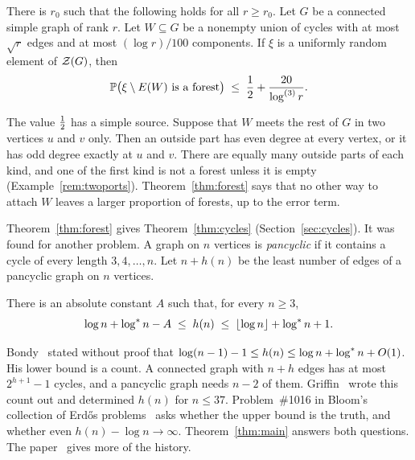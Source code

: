 \begin{theorem}\label{thm:forest}
There is $r_0$ such that the following holds for all $r\ge r_0$. Let $G$ be a connected simple graph
of rank $r$. Let $W\subseteq G$ be a nonempty union of cycles with at most $\sqrt r$ edges and at
most $(\log r)/100$ components. If $\xi$ is a uniformly random element of $\mathcal{Z}(G)$, then
\begin{equation}\label{eq:forest}
  \mathbb{P}\bigl(\xi\setminus E(W)\text{ is a forest}\bigr)\;\le\;\frac12+\frac{20}{\log^{(3)}r}.
\end{equation}
\end{theorem}

The value $\tfrac12$ has a simple source. Suppose that $W$ meets the rest of $G$ in two vertices $u$
and $v$ only. Then an outside part has even degree at every vertex, or it has odd degree exactly at
$u$ and $v$. There are equally many outside parts of each kind, and one of the first kind is not a
forest unless it is empty (Example~\ref{rem:twoports}). Theorem~\ref{thm:forest} says that no other
way to attach $W$ leaves a larger proportion of forests, up to the error term.

Theorem~\ref{thm:forest} gives Theorem~\ref{thm:cycles} (Section~\ref{sec:cycles}). It was found
for another problem. A graph on $n$ vertices is \emph{pancyclic} if it contains a cycle of every
length $3,4,\dots,n$. Let $n+h(n)$ be the least number of edges of a pancyclic graph on $n$
vertices.

\begin{theorem}\label{thm:main}
There is an absolute constant $A$ such that, for every $n\ge3$,
\[
  \log n+\log^{*} n-A\;\le\;h(n)\;\le\;\lfloor\log n\rfloor+\log^{*} n+1 .
\]
\end{theorem}

Bondy~\cite{Bondy} stated without proof that $\log(n-1)-1\le h(n)\le\log n+\log^{*} n+O(1)$. His lower
bound is a count. A connected graph with $n+h$ edges has at most $2^{h+1}-1$ cycles, and a pancyclic
graph needs $n-2$ of them. Griffin~\cite{Griffin} wrote this count out and determined $h(n)$ for
$n\le37$. Problem~\#1016 in Bloom's collection of Erd\H{o}s problems~\cite{Bloom}
asks whether the upper bound is the truth, and whether even $h(n)-\log n\to\infty$.
Theorem~\ref{thm:main} answers both questions. The paper~\cite{KNT} gives more of the history.

